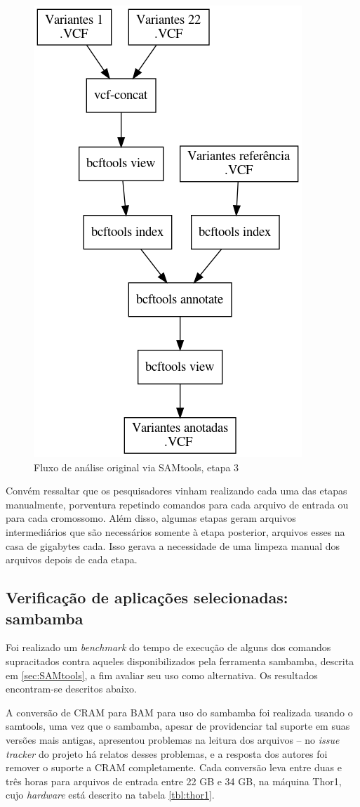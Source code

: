\documentclass[cic,tc]{iiufrgs}
\begin{document}
\begin{figure}
  \caption{Fluxo de análise original via SAMtools, etapa 3}
    \begin{center}
      \includegraphics[width=0.55\linewidth]{img/stage3_orig.png}
    \end{center}
    \label{fig:stage3_orig}
\end{figure}

Convém ressaltar que os pesquisadores vinham realizando cada uma das etapas
manualmente, porventura repetindo comandos para cada arquivo de entrada ou para
cada cromossomo. Além disso, algumas etapas geram arquivos intermediários que
são necessários somente à etapa posterior, arquivos esses na casa de gigabytes
cada. Isso gerava a necessidade de uma limpeza manual dos arquivos depois de
cada etapa.

\subsection{Verificação de aplicações selecionadas: sambamba}

Foi realizado um \textit{benchmark} do tempo de execução de alguns dos comandos
supracitados contra aqueles disponibilizados pela ferramenta sambamba, descrita
em \ref{sec:SAMtools}, a fim avaliar seu uso como alternativa. Os resultados
encontram-se descritos abaixo.

A conversão de CRAM para BAM para uso do sambamba foi realizada usando o
samtools, uma vez que o sambamba, apesar de providenciar tal suporte em suas
versões mais antigas, apresentou problemas na leitura dos arquivos -- no
\textit{issue tracker} do projeto há relatos desses problemas, e a resposta dos
autores foi remover o suporte a CRAM completamente. Cada conversão leva entre
duas e três horas para arquivos de entrada entre 22 GB e 34 GB, na máquina
Thor1, cujo \textit{hardware} está descrito na tabela \ref{tbl:thor1}.
\end{document}
